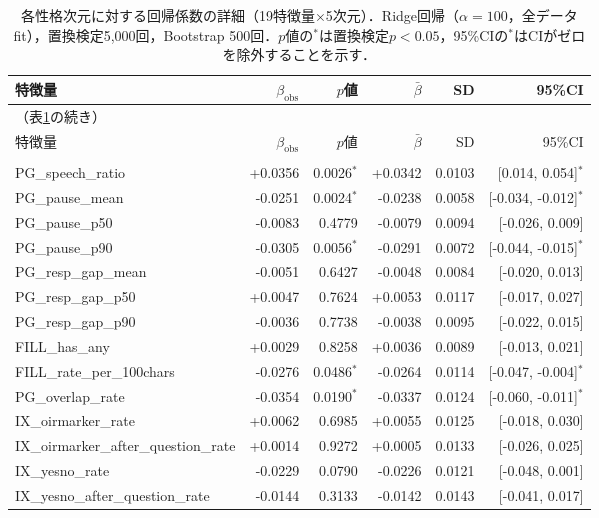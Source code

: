 \begingroup
\footnotesize
\setlength{\tabcolsep}{4pt}
\begin{longtable}{lrrrrr}
\caption{各性格次元に対する回帰係数の詳細（19特徴量$\times$5次元）．Ridge回帰（$\alpha = 100$，全データfit），置換検定5,000回，Bootstrap 500回．$p$値の$^{*}$は置換検定$p < 0.05$，95\%CIの$^{*}$はCIがゼロを除外することを示す．}\label{tab:coef_all5_detail}\\
\toprule
特徴量 & $\beta_{\mathrm{obs}}$ & $p$値 & $\bar{\beta}$ & SD & 95\%CI \\
\midrule
\endfirsthead
\multicolumn{6}{l}{（表\ref{tab:coef_all5_detail}の続き）}\\
\toprule
特徴量 & $\beta_{\mathrm{obs}}$ & $p$値 & $\bar{\beta}$ & SD & 95\%CI \\
\midrule
\endhead
\bottomrule
\endlastfoot
\multicolumn{6}{l}{\textit{O}} \\
\quad PG\_speech\_ratio & +0.0356 & 0.0026$^{*}$ & +0.0342 & 0.0103 & [0.014, 0.054]$^{*}$ \\
\quad PG\_pause\_mean & -0.0251 & 0.0024$^{*}$ & -0.0238 & 0.0058 & [-0.034, -0.012]$^{*}$ \\
\quad PG\_pause\_p50 & -0.0083 & 0.4779 & -0.0079 & 0.0094 & [-0.026, 0.009] \\
\quad PG\_pause\_p90 & -0.0305 & 0.0056$^{*}$ & -0.0291 & 0.0072 & [-0.044, -0.015]$^{*}$ \\
\quad PG\_resp\_gap\_mean & -0.0051 & 0.6427 & -0.0048 & 0.0084 & [-0.020, 0.013] \\
\quad PG\_resp\_gap\_p50 & +0.0047 & 0.7624 & +0.0053 & 0.0117 & [-0.017, 0.027] \\
\quad PG\_resp\_gap\_p90 & -0.0036 & 0.7738 & -0.0038 & 0.0095 & [-0.022, 0.015] \\
\quad FILL\_has\_any & +0.0029 & 0.8258 & +0.0036 & 0.0089 & [-0.013, 0.021] \\
\quad FILL\_rate\_per\_100chars & -0.0276 & 0.0486$^{*}$ & -0.0264 & 0.0114 & [-0.047, -0.004]$^{*}$ \\
\quad PG\_overlap\_rate & -0.0354 & 0.0190$^{*}$ & -0.0337 & 0.0124 & [-0.060, -0.011]$^{*}$ \\
\quad IX\_oirmarker\_rate & +0.0062 & 0.6985 & +0.0055 & 0.0125 & [-0.018, 0.030] \\
\quad IX\_oirmarker\_after\_question\_rate & +0.0014 & 0.9272 & +0.0005 & 0.0133 & [-0.026, 0.025] \\
\quad IX\_yesno\_rate & -0.0229 & 0.0790 & -0.0226 & 0.0121 & [-0.048, 0.001] \\
\quad IX\_yesno\_after\_question\_rate & -0.0144 & 0.3133 & -0.0142 & 0.0143 & [-0.041, 0.017] \\

\end{longtable}
